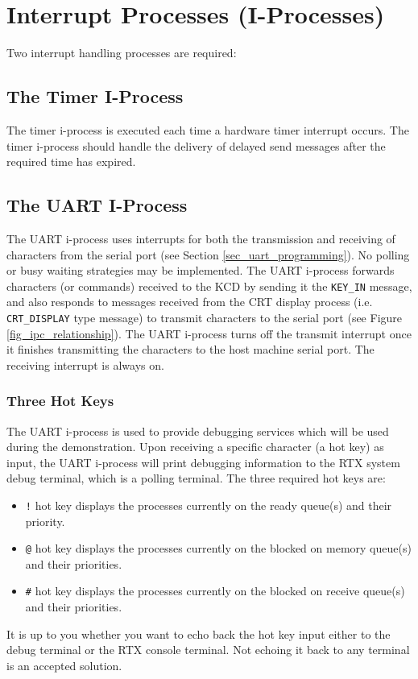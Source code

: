 \section{Interrupt Processes (I-Processes)}
\label{sec_iprocs}
Two interrupt handling processes are required:

\subsection{The Timer I-Process}
\label{sec_timer_iproc}
The timer i-process is executed each time a hardware timer interrupt occurs. The timer i-process should handle the delivery of delayed send messages after the required time has expired.

\subsection{The UART I-Process}
\label{sec_uart_iproc}
The UART i-process uses interrupts for both the transmission and receiving of characters from the serial port (see Section \ref{sec_uart_programming}). No polling or busy waiting strategies may be implemented. The UART i-process forwards characters (or commands) received to the KCD by sending it the \verb+KEY_IN+ message, and also responds to messages received from the CRT display process (i.e. \verb+CRT_DISPLAY+ type message) to transmit characters to the serial port (see Figure \ref{fig_ipc_relationship}). The UART i-process turns off the transmit interrupt once it finishes transmitting the characters to the host machine serial port. The receiving interrupt is always on.  

\subsubsection{Three Hot Keys} 
The UART i-process is used to provide debugging services which will be used during the demonstration. Upon receiving a specific character (a hot key) as input, the UART i-process will print debugging information to the RTX system debug terminal, which is a polling terminal. The three required hot keys are:
\begin{itemize}
\item \verb+!+ hot key displays the processes currently on the ready queue(s) and their priority. 
\item \verb+@+ hot key displays the processes currently on the blocked on memory queue(s) and their priorities. 
\item \verb+#+ hot key displays the processes currently on the blocked on receive queue(s) and their priorities.
\end{itemize}
It is up to you whether you want to echo back the hot key input either to the debug terminal or the RTX console terminal. Not echoing it back to any terminal is an accepted solution. 

